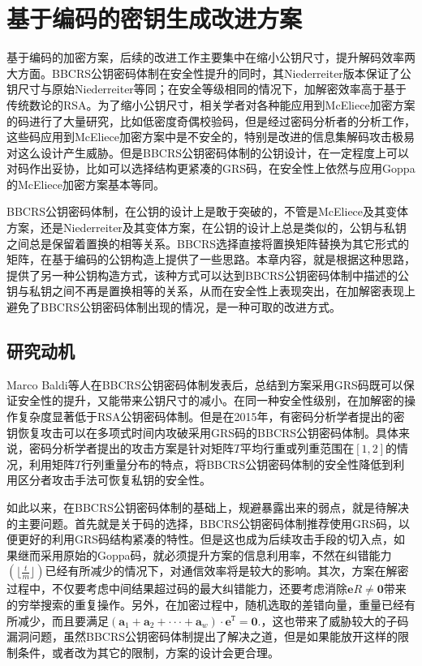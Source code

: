 \chapter{基于编码的密钥生成改进方案}
基于编码的加密方案，后续的改进工作主要集中在缩小公钥尺寸，提升解码效率两大方面。BBCRS公钥密码体制在安全性提升的同时，其Niederreiter版本保证了公钥尺寸与原始Niederreiter等同；在安全等级相同的情况下，加解密效率高于基于传统数论的RSA。为了缩小公钥尺寸，相关学者对各种能应用到McEliece加密方案的码进行了大量研究，比如低密度奇偶校验码，但是经过密码分析者的分析工作，这些码应用到McEliece加密方案中是不安全的，特别是改进的信息集解码攻击极易对这么设计产生威胁。但是BBCRS公钥密码体制的公钥设计，在一定程度上可以对码作出妥协，比如可以选择结构更紧凑的GRS码，在安全性上依然与应用Goppa的McEliece加密方案基本等同。

BBCRS公钥密码体制，在公钥的设计上是敢于突破的，不管是McEliece及其变体方案，还是Niederreiter及其变体方案，在公钥的设计上总是类似的，公钥与私钥之间总是保留着置换的相等关系。BBCRS选择直接将置换矩阵替换为其它形式的矩阵，在基于编码的公钥构造上提供了一些思路。本章内容，就是根据这种思路，提供了另一种公钥构造方式，该种方式可以达到BBCRS公钥密码体制中描述的公钥与私钥之间不再是置换相等的关系，从而在安全性上表现突出，在加解密表现上避免了BBCRS公钥密码体制出现的情况，是一种可取的改进方式。

\section{研究动机}
Marco Baldi等人在BBCRS公钥密码体制发表后，总结到方案采用GRS码既可以保证安全性的提升，又能带来公钥尺寸的减小。在同一种安全性级别，在加解密的操作复杂度显著低于RSA公钥密码体制。但是在2015年，有密码分析学者提出的密钥恢复攻击\cite{Couvreur2015A}可以在多项式时间内攻破采用GRS码的BBCRS公钥密码体制。具体来说，密码分析学者提出的攻击方案是针对矩阵$T$平均行重或列重范围在$[1,2]$的情况，利用矩阵$T$行列重量分布的特点，将BBCRS公钥密码体制的安全性降低到利用区分者攻击手法可恢复私钥的安全性。

如此以来，在BBCRS公钥密码体制的基础上，规避暴露出来的弱点，就是待解决的主要问题。首先就是关于码的选择，BBCRS公钥密码体制推荐使用GRS码，以便更好的利用GRS码结构紧凑的特性。但是这也成为后续攻击手段的切入点，如果继而采用原始的Goppa码，就必须提升方案的信息利用率，不然在纠错能力$(\lfloor \frac{t}{m} \rfloor)$已经有所减少的情况下，对通信效率将是较大的影响。其次，方案在解密过程中，不仅要考虑中间结果超过码的最大纠错能力，还要考虑消除$\mathbf{e}R \neq \mathbf{0}$带来的穷举搜索的重复操作。另外，在加密过程中，随机选取的差错向量，重量已经有所减少，而且要满足$(\mathbf{a}_1 + \mathbf{a}_2 + ··· + \mathbf{a}_w) \cdot \mathbf{e}^\mathtt{T} = \mathbf{0}.$，这也带来了威胁较大的子码漏洞问题，虽然BBCRS公钥密码体制提出了解决之道，但是如果能放开这样的限制条件，或者改为其它的限制，方案的设计会更合理。


